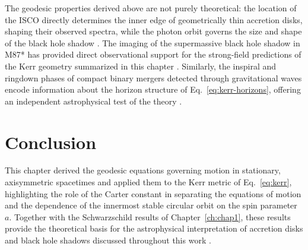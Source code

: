 The geodesic properties derived above are not purely theoretical: the location of the ISCO directly determines the inner edge of geometrically thin accretion disks, shaping their observed spectra, while the photon orbit governs the size and shape of the black hole shadow \cite{eht2019}. The imaging of the supermassive black hole shadow in M87* has provided direct observational support for the strong-field predictions of the Kerr geometry summarized in this chapter \cite{eht2019}. Similarly, the inspiral and ringdown phases of compact binary mergers detected through gravitational waves encode information about the horizon structure of Eq.~\eqref{eq:kerr-horizons}, offering an independent astrophysical test of the theory \cite{ligo2016,teukolsky2015}.

\section{Conclusion}

This chapter derived the geodesic equations governing motion in stationary, axisymmetric spacetimes and applied them to the Kerr metric of Eq.~\eqref{eq:kerr}, highlighting the role of the Carter constant in separating the equations of motion and the dependence of the innermost stable circular orbit on the spin parameter $a$. Together with the Schwarzschild results of Chapter~\ref{ch:chap1}, these results provide the theoretical basis for the astrophysical interpretation of accretion disks and black hole shadows discussed throughout this work \cite{bardeen1972,eht2019}.